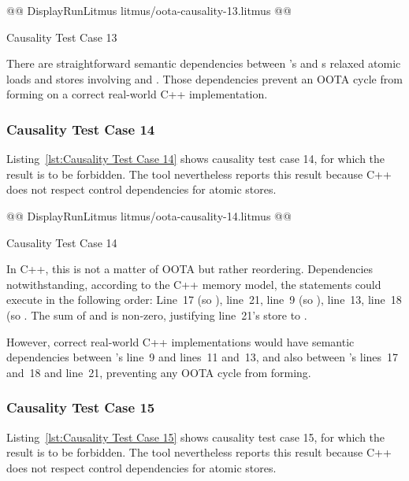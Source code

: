 \documentclass[10]{article}
\begin{document}
\begin{listing}[tbp]
@@ DisplayRunLitmus litmus/oota-causality-13.litmus @@
\caption{Causality Test Case 13}
\label{lst:Causality Test Case 13}
\end{listing}

There are straightforward semantic dependencies between 's and
s relaxed atomic loads and stores involving  and .
Those dependencies prevent an OOTA cycle from forming on a correct
real-world C++ implementation.

\subsubsection{Causality Test Case 14}
\label{app:Causality Test Case 14}

Listing~\ref{lst:Causality Test Case 14}
shows causality test case 14, for which the 
result is to be forbidden.
The  tool nevertheless reports this result because C++ does not
respect control dependencies for atomic stores.

\begin{listing}[tbp]
@@ DisplayRunLitmus litmus/oota-causality-14.litmus @@
\caption{Causality Test Case 14}
\label{lst:Causality Test Case 14}
\end{listing}

In C++, this is not a matter of OOTA but rather reordering.
Dependencies notwithstanding, according to the C++ memory model,
the statements could execute in the following order:
Line~17 (so ), line~21, line~9 (so ),
line~13, line~18 (so .
The sum of  and  is non-zero, justifying line~21's
store to .

However, correct real-world C++ implementations would have semantic
dependencies between 's line~9 and lines~11 and~13, and also
between 's lines~17 and~18 and line~21, preventing any
OOTA cycle from forming.

\subsubsection{Causality Test Case 15}
\label{app:Causality Test Case 15}

Listing~\ref{lst:Causality Test Case 15}
shows causality test case 15, for which the 
result is to be forbidden.
The  tool nevertheless reports this result because C++ does not
respect control dependencies for atomic stores.
\end{document}
